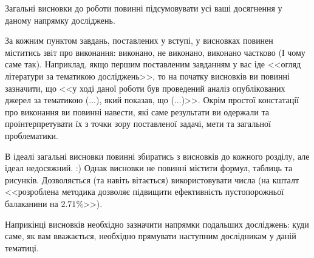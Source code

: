 Загальні висновки до роботи повинні підсумовувати усі ваші досягнення у 
даному напрямку досліджень.

За кожним пунктом завдань, поставлених у вступі, у висновках повинен 
міститись звіт про виконання: виконано, не виконано, виконано частково (І 
чому саме так). Наприклад, якщо першим поставленим завданням у вас іде 
<<огляд літератури за тематикою досліджень>>, то на початку висновків ви 
повинні зазначити, що <<у ході даної роботи був проведений аналіз 
опублікованих джерел за тематикою (...), який показав, що (...)>>. Окрім 
простої констатації про виконання ви повинні навести, які саме результати 
ви одержали та проінтерпретувати їх з точки зору поставленої задачі, мети 
та загальної проблематики.

В ідеалі загальні висновки повинні збиратись з висновків до кожного 
розділу, але ідеал недосяжний. :) Однак висновки не повинні містити 
формул, таблиць та рисунків. Дозволяється (та навіть вітається) 
використовувати числа (на кшталт <<розроблена методика дозволяє підвищити 
ефективність пустопорожньої балаканини на $2.71\%$>>).

Наприкінці висновків необхідно зазначити напрямки подальших досліджень: 
куди саме, як вам вважається, необхідно прямувати наступним дослідникам у 
даній тематиці.
